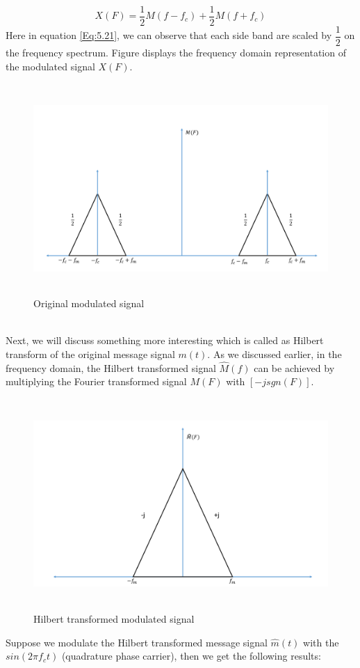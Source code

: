 \begin{equation}
X(F)=\frac{1}{2}M(f-f_c)+\frac{1}{2}M(f+f_c)
\label{Eq:5.21}
\end{equation}
Here in equation \ref{Eq:5.21}, we can observe that each side band are scaled by $\dfrac{1}{2}$ on the frequency spectrum. Figure displays the frequency domain representation of the modulated signal $X(F)$.
\begin{figure}[h]
	\centering
	\includegraphics[width=1.0\textwidth, height=8cm]{./sdf/simplified_coherent_receiver/figures/SSB2.pdf}
	\caption{Original modulated signal}\label{Original_modulated_signal}
\end{figure}\\ 
Next, we will discuss something more interesting which is called as Hilbert transform of the original message signal $m(t)$. As we discussed earlier, in the frequency domain, the Hilbert transformed signal $\hat{M}(f)$ can be achieved by multiplying the Fourier transformed signal $M(F)$ with $[-j sgn(F)]$.
\begin{figure}[h]
	\centering
	\includegraphics[width=1.0\textwidth, height=8cm]{./sdf/simplified_coherent_receiver/figures/SSB3.pdf}
	\caption{Hilbert transformed modulated signal}\label{Hilbert_Transformed_signal}
\end{figure}
Suppose we modulate the Hilbert transformed message signal $\hat{m}(t)$  with the $sin(2\pi f_c t)$ (quadrature phase carrier), then we get the following results:


